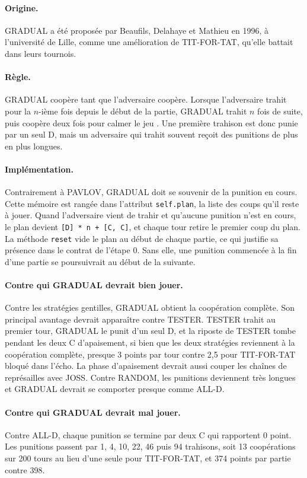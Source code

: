 \documentclass[11pt,a4paper]{article}
\begin{document}
\paragraph{Origine.} GRADUAL a été proposée par Beaufils, Delahaye et Mathieu en 1996, à l'université de Lille, comme une
amélioration de TIT-FOR-TAT, qu'elle battait dans leurs tournois.

\paragraph{Règle.} GRADUAL coopère tant que l'adversaire coopère. Lorsque l'adversaire trahit pour la $n$-ième fois depuis le
début de la partie, GRADUAL trahit $n$ fois de suite, puis coopère deux fois pour \og calmer le jeu \fg{}. Une première
trahison est donc punie par un seul D, mais un adversaire qui trahit souvent reçoit des punitions de plus en plus longues.

\paragraph{Implémentation.} Contrairement à PAVLOV, GRADUAL doit se souvenir de la punition en cours. Cette mémoire est rangée
dans l'attribut \texttt{self.plan}, la liste des coups qu'il reste à jouer. Quand l'adversaire vient de trahir et qu'aucune
punition n'est en cours, le plan devient \texttt{[D] * n + [C, C]}, et chaque tour retire le premier coup du plan. La méthode
\texttt{reset} vide le plan au début de chaque partie, ce qui justifie sa présence dans le contrat de l'étape 0. Sans elle, une
punition commencée à la fin d'une partie se poursuivrait au début de la suivante.

\paragraph{Contre qui GRADUAL devrait bien jouer.} Contre les stratégies gentilles, GRADUAL obtient la coopération complète.
Son principal avantage devrait apparaître contre TESTER. TESTER trahit au premier tour, GRADUAL le punit d'un seul D, et la
riposte de TESTER tombe pendant les deux C d'apaisement, si bien que les deux stratégies reviennent à la coopération complète,
presque 3 points par tour contre 2,5 pour TIT-FOR-TAT bloqué dans l'écho. La phase d'apaisement devrait aussi couper les
chaînes de représailles avec JOSS. Contre RANDOM, les punitions deviennent très longues et GRADUAL devrait se comporter presque
comme ALL-D.

\paragraph{Contre qui GRADUAL devrait mal jouer.} Contre ALL-D, chaque punition se termine par deux C qui rapportent 0 point.
Les punitions passent par 1, 4, 10, 22, 46 puis 94 trahisons, soit 13 coopérations sur 200 tours au lieu d'une seule pour
TIT-FOR-TAT, et 374 points par partie contre 398.
\end{document}

